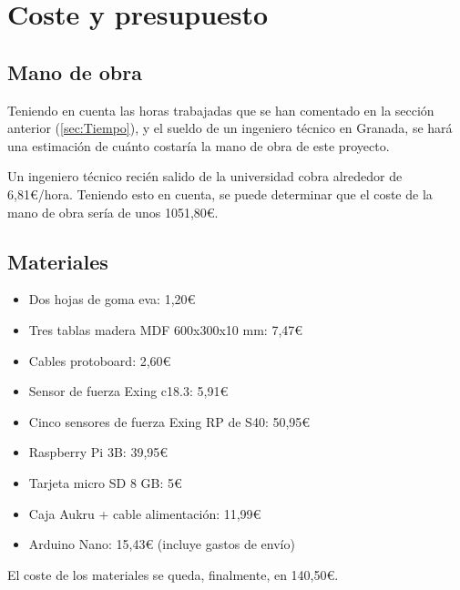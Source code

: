 
    \section{Coste y presupuesto} %
    \label{sec:CosteYPresupuesto}

        \subsection{Mano de obra} %
        \label{sub:ManoDeObra}

            Teniendo en cuenta las horas trabajadas que se han comentado en la sección anterior (\ref{sec:Tiempo}), y el
            sueldo de un ingeniero técnico en Granada, se hará una estimación de cuánto costaría la mano de obra de este
            proyecto.

            Un ingeniero técnico recién salido de la universidad cobra alrededor de 6,81\euro{}/hora. Teniendo esto en
            cuenta, se puede determinar que el coste de la mano de obra sería de unos 1051,80\euro{}.


        \subsection{Materiales} %
        \label{sub:Materiales}

            \begin{itemize}
                \item Dos hojas de goma eva: 1,20\euro{}
                \item Tres tablas madera MDF 600x300x10 mm: 7,47\euro{}
                \item Cables protoboard: 2,60\euro{}
                \item Sensor de fuerza Exing c18.3: 5,91\euro{}
                \item Cinco sensores de fuerza Exing RP de S40: 50,95\euro{}
                \item Raspberry Pi 3B: 39,95\euro{}
                \item Tarjeta micro SD 8 GB: 5\euro{}
                \item Caja Aukru + cable alimentación: 11,99\euro{}
                \item Arduino Nano: 15,43\euro{} (incluye gastos de envío)
            \end{itemize}

            El coste de los materiales se queda, finalmente, en 140,50\euro{}.



